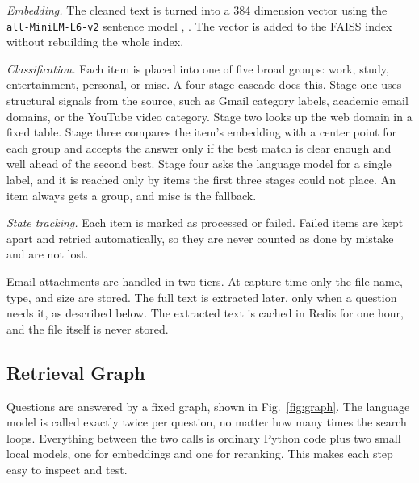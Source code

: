 \documentclass[conference]{IEEEtran}
\begin{document}
\textit{Embedding.} The cleaned text is turned into a 384 dimension vector using the \texttt{all-MiniLM-L6-v2} sentence model \cite{b6}, \cite{b7}. The vector is added to the FAISS index without rebuilding the whole index.

\textit{Classification.} Each item is placed into one of five broad groups: work, study, entertainment, personal, or misc. A four stage cascade does this. Stage one uses structural signals from the source, such as Gmail category labels, academic email domains, or the YouTube video category. Stage two looks up the web domain in a fixed table. Stage three compares the item's embedding with a center point for each group and accepts the answer only if the best match is clear enough and well ahead of the second best. Stage four asks the language model for a single label, and it is reached only by items the first three stages could not place. An item always gets a group, and misc is the fallback.

\textit{State tracking.} Each item is marked as processed or failed. Failed items are kept apart and retried automatically, so they are never counted as done by mistake and are not lost.

Email attachments are handled in two tiers. At capture time only the file name, type, and size are stored. The full text is extracted later, only when a question needs it, as described below. The extracted text is cached in Redis for one hour, and the file itself is never stored.

\subsection{Retrieval Graph}
Questions are answered by a fixed graph, shown in Fig.~\ref{fig:graph}. The language model is called exactly twice per question, no matter how many times the search loops. Everything between the two calls is ordinary Python code plus two small local models, one for embeddings and one for reranking. This makes each step easy to inspect and test.
\end{document}
